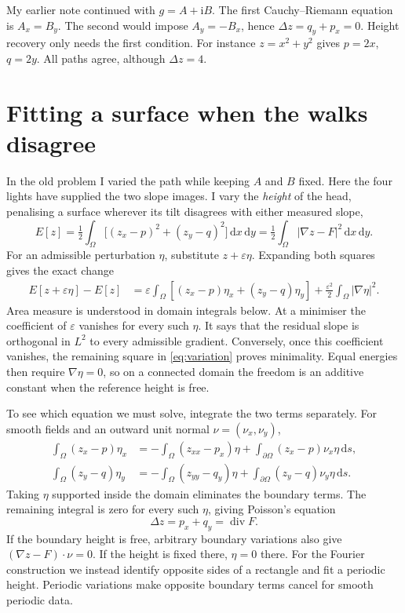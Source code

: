 \documentclass[11pt,a4paper]{article}
\numberwithin{equation}{section}
\newcommand{\ii}{\mathrm{i}}
\newcommand{\dd}{\mathrm{d}}
\DeclareMathOperator{\Div}{div}
\begin{document}
My earlier note continued with $g=A+\ii B$. The first Cauchy--Riemann
equation is $A_x=B_y$. The second would impose $A_y=-B_x$, hence
$\Delta z=q_y+p_x=0$. Height recovery only needs the first condition.
For instance $z=x^2+y^2$ gives $p=2x$, $q=2y$. All paths agree, although
$\Delta z=4$.

\newpage
\section{Fitting a surface when the walks disagree}

In the old problem I varied the path while keeping $A$ and $B$ fixed.
Here the four lights have supplied the two slope images. I vary the
\emph{height} of the head, penalising a surface wherever its tilt disagrees
with either measured slope,
\begin{equation}
 E[z]=\tfrac12\int_\Omega\big[(z_x-p)^2+(z_y-q)^2\big]\,\dd x\,\dd y
     =\tfrac12\int_\Omega|\nabla z-F|^2\,\dd x\,\dd y .
 \label{eq:energy}
\end{equation}
For an admissible perturbation $\eta$, substitute $z+\varepsilon\eta$.
Expanding both squares gives the exact change
\begin{align}
 E[z+\varepsilon\eta]-E[z]
 &=\varepsilon\int_\Omega[(z_x-p)\eta_x+(z_y-q)\eta_y]
   +\tfrac{\varepsilon^2}{2}\int_\Omega|\nabla\eta|^2 . \label{eq:variation}
\end{align}
Area measure is understood in domain integrals below. At a minimiser the
coefficient of $\varepsilon$ vanishes for every such $\eta$. It says that
the residual slope is orthogonal in $L^2$ to every admissible gradient.
Conversely, once this coefficient vanishes, the remaining square in
\eqref{eq:variation} proves minimality. Equal energies then require
$\nabla\eta=0$, so on a connected domain the freedom is an additive constant
when the reference height is free.

To see which equation we must solve, integrate the two terms separately.
For smooth fields and an outward unit normal $\nu=(\nu_x,\nu_y)$,
\begin{align}
 \int_\Omega(z_x-p)\eta_x
  &=-\int_\Omega(z_{xx}-p_x)\eta
    +\int_{\partial\Omega}(z_x-p)\nu_x\eta\,\dd s,\nonumber\\
 \int_\Omega(z_y-q)\eta_y
  &=-\int_\Omega(z_{yy}-q_y)\eta
    +\int_{\partial\Omega}(z_y-q)\nu_y\eta\,\dd s .
\end{align}
Taking $\eta$ supported inside the domain eliminates the boundary terms.
The remaining integral is zero for every such $\eta$, giving Poisson's equation
\begin{equation}
 \boxed{\Delta z=p_x+q_y=\Div F.} \label{eq:poisson}
\end{equation}
If the boundary height is free, arbitrary boundary variations also give
$(\nabla z-F)\cdot\nu=0$. If the height is fixed there, $\eta=0$ there.
For the Fourier construction we instead identify opposite sides of a
rectangle and fit a periodic height. Periodic variations make opposite
boundary terms cancel for smooth periodic data.
\end{document}
